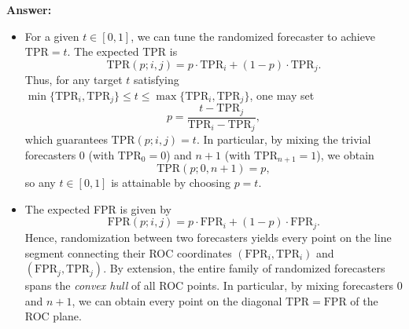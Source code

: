 \documentclass[a4paper]{article}
\begin{document}
\textbf{Answer:}
\begin{itemize}
    \item For a given $t \in [0,1]$, we can tune the randomized forecaster to achieve $\mathrm{TPR}=t$.  
    The expected TPR is
    \[
    \mathrm{TPR}(p;i,j) = p\cdot \mathrm{TPR}_i + (1-p)\cdot \mathrm{TPR}_j.
    \]
    Thus, for any target $t$ satisfying $\min\{\mathrm{TPR}_i,\mathrm{TPR}_j\} \le t \le \max\{\mathrm{TPR}_i,\mathrm{TPR}_j\}$, one may set
    \[
    p = \frac{t - \mathrm{TPR}_j}{\mathrm{TPR}_i - \mathrm{TPR}_j},
    \]
    which guarantees $\mathrm{TPR}(p;i,j)=t$.  
    In particular, by mixing the trivial forecasters $0$ (with $\mathrm{TPR}_0=0$) and $n+1$ (with $\mathrm{TPR}_{n+1}=1$), we obtain
    \[
    \mathrm{TPR}(p;0,n+1) = p, 
    \]
    so any $t \in [0,1]$ is attainable by choosing $p=t$.

    \item The expected FPR is given by
    \[
    \mathrm{FPR}(p;i,j) = p\cdot \mathrm{FPR}_i + (1-p)\cdot \mathrm{FPR}_j.
    \]
    Hence, randomization between two forecasters yields every point on the line segment connecting their ROC coordinates $(\mathrm{FPR}_i,\mathrm{TPR}_i)$ and $(\mathrm{FPR}_j,\mathrm{TPR}_j)$.  
    By extension, the entire family of randomized forecasters spans the \emph{convex hull} of all ROC points.  
    In particular, by mixing forecasters $0$ and $n+1$, we can obtain every point on the diagonal $\mathrm{TPR}=\mathrm{FPR}$ of the ROC plane.
\end{itemize}
\end{document}
